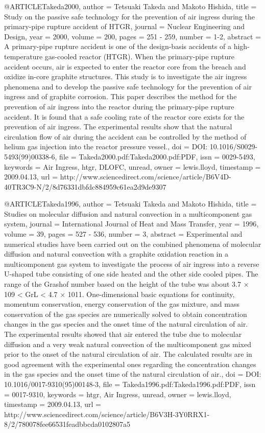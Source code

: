 {{@ARTICLE{Takeda2000,
  author = {Tetsuaki Takeda and Makoto Hishida},
  title = {Study on the passive safe technology for the prevention of air ingress
	during the primary-pipe rupture accident of HTGR},
  journal = {Nuclear Engineering and Design},
  year = {2000},
  volume = {200},
  pages = {251 - 259},
  number = {1-2},
  abstract = {A primary-pipe rupture accident is one of the design-basis accidents
	of a high-temperature gas-cooled reactor (HTGR). When the primary-pipe
	rupture accident occurs, air is expected to enter the reactor core
	from the breach and oxidize in-core graphite structures. This study
	is to investigate the air ingress phenomena and to develop the passive
	safe technology for the prevention of air ingress and of graphite
	corrosion. This paper describes the method for the prevention of
	air ingress into the reactor during the primary-pipe rupture accident.
	It is found that a safe cooling rate of the reactor core exists for
	the prevention of air ingress. The experimental results show that
	the natural circulation flow of air during the accident can be controlled
	by the method of helium gas injection into the reactor pressure vessel.},
  doi = {DOI: 10.1016/S0029-5493(99)00338-6},
  file = {Takeda2000.pdf:Takeda2000.pdf:PDF},
  issn = {0029-5493},
  keywords = {Air Ingress, htgr, DLOFC, unread},
  owner = {lewis.lloyd},
  timestamp = {2009.04.13},
  url = {http://www.sciencedirect.com/science/article/B6V4D-40TR3C9-N/2/8d76331dbfdc884959c61ea2d9de9307}
}

@ARTICLE{Takeda1996,
  author = {Tetsuaki Takeda and Makoto Hishida},
  title = {Studies on molecular diffusion and natural convection in a multicomponent
	gas system},
  journal = {International Journal of Heat and Mass Transfer},
  year = {1996},
  volume = {39},
  pages = {527 - 536},
  number = {3},
  abstract = {Experimental and numerical studies have been carried out on the combined
	phenomena of molecular diffusion and natural convection with a graphite
	oxidation reaction in a multicomponent gas system to investigate
	the process of air ingress into a reverse U-shaped tube consisting
	of one side heated and the other side cooled pipes. The range of
	the Grashof number based on the height of the tube was about 3.7
	× 109 < GrL < 4.7 × 1011. One-dimensional basic equations for continuity,
	momentum conservation, energy conservation of the gas mixture, and
	mass conservation of the gas species are numerically solved to obtain
	concentration changes in the gas species and the onset time of the
	natural circulation of air. The experimental results showed that
	air entered the tube due to molecular diffusion and a very weak natural
	convection of the multicomponent gas mixed prior to the onset of
	the natural circulation of air. The calculated results are in good
	agreement with the experimental ones regarding the concentration
	changes in the gas species and the onset time of the natural circulation
	of air.},
  doi = {DOI: 10.1016/0017-9310(95)00148-3},
  file = {Takeda1996.pdf:Takeda1996.pdf:PDF},
  issn = {0017-9310},
  keywords = {htgr, Air Ingress, unread},
  owner = {lewis.lloyd},
  timestamp = {2009.04.13},
  url = {http://www.sciencedirect.com/science/article/B6V3H-3Y0RRX1-8/2/780078fee66531feadbbcda0102807a5}
}

}}

